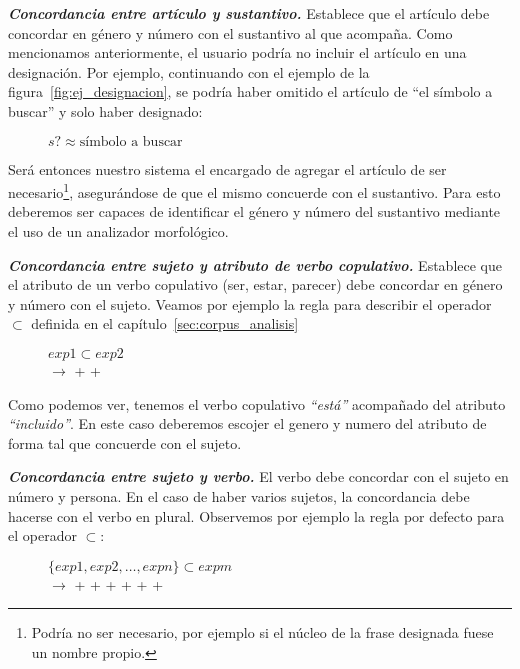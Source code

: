\medskip
\noindent
\textbf{\emph{Concordancia entre artículo y sustantivo.}} Establece que el artículo debe concordar en género y número con el sustantivo al que acompaña.
\noindent
Como mencionamos anteriormente, el usuario podría no incluir el artículo en una designación. Por ejemplo, continuando con el ejemplo de la figura~\ref{fig:ej_designacion}, se podría haber omitido el artículo de ``el símbolo a buscar'' y solo haber designado:
\begin{figure}[H]
	\center
    $s? \approx \text{símbolo a buscar}$
\end{figure}
\noindent
Será entonces nuestro sistema el encargado de agregar el artículo de ser necesario\footnote{Podría no ser necesario, por ejemplo si el núcleo de la frase designada fuese un nombre propio.}, asegurándose de que el mismo concuerde con el sustantivo. Para esto deberemos ser capaces de identificar el género y número del sustantivo mediante el uso de un analizador morfológico.

\medskip
\noindent
\textbf{\emph{Concordancia entre sujeto y atributo de verbo copulativo.}} Establece que el atributo de un verbo copulativo (ser, estar, parecer) debe concordar en género y número con el sujeto.
\noindent
Veamos por ejemplo la regla para describir el operador $\subset$ definida en el capítulo~\ref{sec:corpus_analisis}

\begin{figure}[H]
	$exp1 \subset exp2$ \\
	\hspace*{0.56cm} $\rightarrow$  +  + 
\end{figure}
\noindent
Como podemos ver, tenemos el verbo copulativo \emph{``está''} acompañado del atributo \emph{``incluido''}. En este caso deberemos escojer el genero y numero del atributo de forma tal que concuerde con el sujeto.

\medskip
\noindent
\textbf{\emph{Concordancia entre sujeto y verbo.}} El verbo debe concordar con el sujeto en número y persona. En el caso de haber varios sujetos, la concordancia debe hacerse con el verbo en plural.
\noindent
Observemos por ejemplo la regla por defecto para el operador $\subset$:

\begin{figure}[H]
	$\{exp1, exp2, \ldots , expn\} \subset expm$ \\
	\hspace*{0.56cm} $\rightarrow$ + \nlgtext{,} +  +  +  +  + 
\end{figure}


